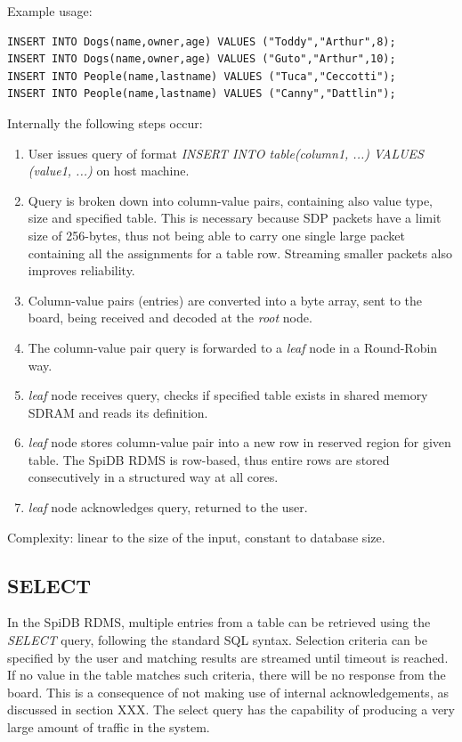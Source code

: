 Example usage:
\begin{lstlisting}
INSERT INTO Dogs(name,owner,age) VALUES ("Toddy","Arthur",8);
INSERT INTO Dogs(name,owner,age) VALUES ("Guto","Arthur",10);
INSERT INTO People(name,lastname) VALUES ("Tuca","Ceccotti");
INSERT INTO People(name,lastname) VALUES ("Canny","Dattlin");
\end{lstlisting}

Internally the following steps occur:
\begin{enumerate}
\item User issues query of format \textit{INSERT INTO table(column1, ...) VALUES (value1, ...)} on host machine.
\item Query is broken down into column-value pairs, containing also value type, size and specified table. This is necessary because SDP packets have a limit size of 256-bytes, thus not being able to carry one single large packet containing all the assignments for a table row. Streaming smaller packets also improves reliability.
\item Column-value pairs (entries) are converted into a byte array, sent to the board, being received and decoded at the \textit{root} node.
\item The column-value pair query is forwarded to a \textit{leaf} node in a Round-Robin way.
\item \textit{leaf} node receives query, checks if specified table exists in shared memory SDRAM and reads its definition.
\item \textit{leaf} node stores column-value pair into a new row in reserved region for given table. The SpiDB RDMS is row-based, thus entire rows are stored consecutively in a structured way at all cores.
\item \textit{leaf} node acknowledges query, returned to the user.
\end{enumerate}

Complexity: linear to the size of the input, constant to database size.

\subsection{SELECT}   
In the SpiDB RDMS, multiple entries from a table can be retrieved using the \textit{SELECT} query, following the standard SQL syntax. Selection criteria can be specified by the user and matching results are streamed until timeout is reached. If no value in the table matches such criteria, there will be no response from the board. This is a consequence of not making use of internal acknowledgements, as discussed in section XXX. The select query has the capability of producing a very large amount of traffic in the system.

